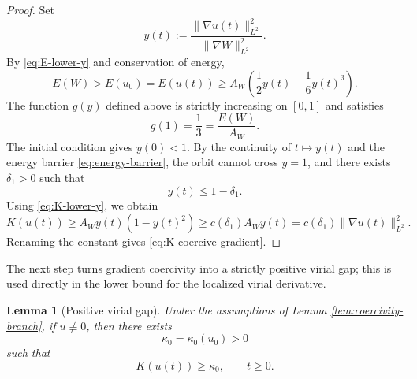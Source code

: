 \documentclass[smallextended,envcountsect,nospthms]{svjour3}
\numberwithin{equation}{section}
\theoremstyle{spbreak}
\newtheorem{lemma}[theorem]{Lemma}
\theoremstyle{spdefbreak}
\theoremstyle{spdefbreak}
\begin{document}
\begin{proof}
Set
\begin{equation*}
  y(t):=\frac{\|\nabla u(t)\|_{L^2}^2}{\|\nabla W\|_{L^2}^2}.
\end{equation*}
By \eqref{eq:E-lower-y} and conservation of energy,
\begin{equation}\label{eq:energy-barrier}
  E(W)>E(u_0)=E(u(t))
  \ge A_W\left(\frac12y(t)-\frac16y(t)^3\right).
\end{equation}
The function $g(y)$ defined above is strictly increasing on $[0,1]$ and satisfies
\begin{equation*}
  g(1)=\frac13=\frac{E(W)}{A_W}.
\end{equation*}
The initial condition gives $y(0)<1$. By the continuity of $t\mapsto y(t)$ and the energy barrier \eqref{eq:energy-barrier}, the orbit cannot cross $y=1$, and there exists $\delta_1>0$ such that
\begin{equation*}
  y(t)\le1-\delta_1.
\end{equation*}
Using \eqref{eq:K-lower-y}, we obtain
\begin{equation*}
  K(u(t))\ge A_Wy(t)(1-y(t)^2)
  \ge c(\delta_1)A_Wy(t)
  =c(\delta_1)\|\nabla u(t)\|_{L^2}^2.
\end{equation*}
Renaming the constant gives \eqref{eq:K-coercive-gradient}.
\end{proof}

The next step turns gradient coercivity into a strictly positive virial gap; this is used directly in the lower bound for the localized virial derivative.

\begin{lemma}[Positive virial gap]\label{lem:positive-K}
Under the assumptions of Lemma \ref{lem:coercivity-branch}, if $u\not\equiv0$, then there exists
\begin{equation*}
  \kappa_0=\kappa_0(u_0)>0
\end{equation*}
such that
\begin{equation}\label{eq:K-kappa0}
  K(u(t))\ge\kappa_0,
  \qquad t\ge0.
\end{equation}
\end{lemma}
\end{document}
